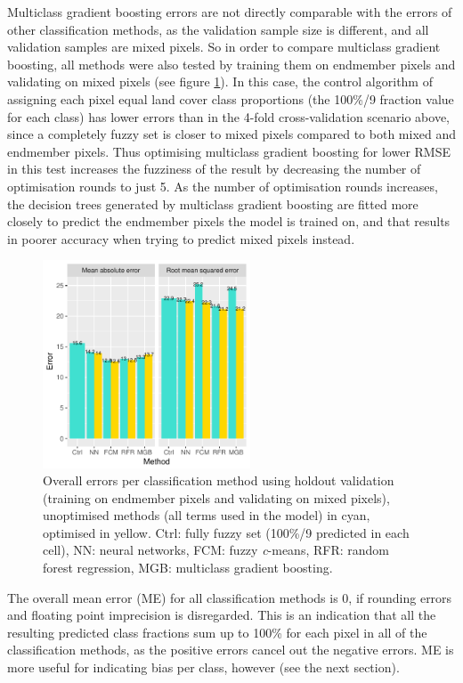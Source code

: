 \documentclass[a4paper,12pt]{scrbook}
\begin{document}
Multiclass gradient boosting errors are not directly comparable with the errors of other classification methods, as the validation sample size is different, and all validation samples are mixed pixels. So in order to compare multiclass gradient boosting, all methods were also tested by training them on endmember pixels and validating on mixed pixels (see figure \ref{fig-total-errors-gb}). In this case, the control algorithm of assigning each pixel equal land cover class proportions (the 100\%/9 fraction value for each class) has lower errors than in the 4-fold cross-validation scenario above, since a completely fuzzy set is closer to mixed pixels compared to both mixed and endmember pixels. Thus optimising multiclass gradient boosting for lower RMSE in this test increases the fuzziness of the result by decreasing the number of optimisation rounds to just 5. As the number of optimisation rounds increases, the decision trees generated by multiclass gradient boosting are fitted more closely to predict the endmember pixels the model is trained on, and that results in poorer accuracy when trying to predict mixed pixels instead.

\begin{figure}
  \centering
  \includegraphics[width=0.55\textwidth]{thesis-figures/total-errors-gb}
  \caption{Overall errors per classification method using holdout validation (training on endmember pixels and validating on mixed pixels), unoptimised methods (all terms used in the model) in cyan, optimised in yellow. Ctrl: fully fuzzy set (100\%/9 predicted in each cell), NN: neural networks, FCM: fuzzy \textit{c}-means, RFR: random forest regression, MGB: multiclass gradient boosting.}
  \label{fig-total-errors-gb}
\end{figure}

The overall mean error (ME) for all classification methods is 0, if rounding errors and floating point imprecision is disregarded. This is an indication that all the resulting predicted class fractions sum up to 100\% for each pixel in all of the classification methods, as the positive errors cancel out the negative errors. ME is more useful for indicating bias per class, however (see the next section).
\end{document}
